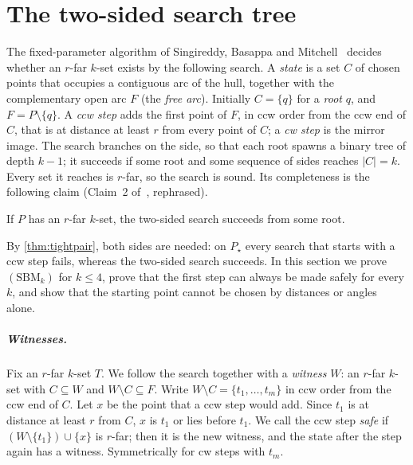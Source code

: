 \chapter{The two-sided search tree}\label{sec:sbm}

The fixed-parameter algorithm of Singireddy, Basappa and Mitchell~\citep{sbm}
decides whether an $r$-far $k$-set exists by the following search. A
\emph{state} is a set $C$ of chosen points that occupies a contiguous arc of
the hull, together with the complementary open arc $F$ (the \emph{free arc}).
Initially $C=\{q\}$ for a \emph{root} $q$, and $F=P\setminus\{q\}$. A
\emph{ccw step} adds the first point of $F$, in ccw order from the ccw end of
$C$, that is at distance at least $r$ from every point of $C$; a \emph{cw
step} is the mirror image. The search branches on the side, so that each root
spawns a binary tree of depth $k-1$; it succeeds if some root and some
sequence of sides reaches $|C|=k$. Every set it reaches is $r$-far, so the
search is sound. Its completeness is the following claim (Claim~2
of~\citet{sbm}, rephrased).

\begin{description}[leftmargin=3.2em,labelwidth=2.6em,itemsep=2pt]
\item[$(\mathrm{SBM}_k)$] If $P$ has an $r$-far $k$-set, the two-sided search
succeeds from some root.
\end{description}

\noindent By \cref{thm:tightpair}, both sides are needed: on $P_\star$ every
search that starts with a ccw step fails, whereas the two-sided search
succeeds. In this section we prove $(\mathrm{SBM}_k)$ for $k\le4$, prove that
the first step can always be made safely for every $k$, and show that the
starting point cannot be chosen by distances or angles alone.

\paragraph{Witnesses.}
Fix an $r$-far $k$-set $T$. We follow the search together with a
\emph{witness} $W$: an $r$-far $k$-set with $C\subseteq W$ and $W\setminus
C\subseteq F$. Write $W\setminus C=\{t_1,\dots,t_m\}$ in ccw order from the
ccw end of $C$. Let $x$ be the point that a ccw step would add. Since $t_1$ is
at distance at least $r$ from $C$, $x$ is $t_1$ or lies before $t_1$. We call
the ccw step \emph{safe} if $(W\setminus\{t_1\})\cup\{x\}$ is $r$-far; then it
is the new witness, and the state after the step again has a witness.
Symmetrically for cw steps with $t_m$.

